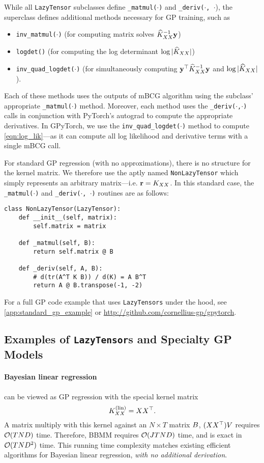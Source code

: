 While all {\tt LazyTensor} subclasses define {\tt \_matmul($\cdot$)} and {\tt \_deriv($\cdot$, $\cdot$}),
the superclass defines additional methods necessary for GP training, such as
%
\begin{itemize}
  \item {\tt inv\_matmul($\cdot$)} (for computing matrix solves $\widehat{K}_{XX}^{-1} \mathbf{y}$)
  \item {\tt logdet()} (for computing the log determinant $\log \vert \widehat{K}_{XX} \vert$)
  \item {\tt inv\_quad\_logdet($\cdot$)} (for simultaneously computing $\mathbf{y}^\top \widehat{K}_{XX}^{-1} \mathbf{y}$ and $\log \vert \widehat{K}_{XX} \vert$).
\end{itemize}
%
Each of these methods uses the outputs of mBCG algorithm using the subclass' appropriate {\tt \_matmul($\cdot$)} method.
Moreover, each method uses the {\tt \_deriv($\cdot$,$\cdot$)} calls in conjunction with PyTorch's autograd \cite{paszke2017automatic} to compute the appropriate derivatives.
In GPyTorch, we use the {\tt inv\_quad\_logdet($\cdot$)} method to compute \cref{eqn:log_lik}---as it can compute all log likelihood and derivative terms with a single mBCG call.

For standard GP regression (with no approximations), there is no structure for the kernel matrix.
We therefore use the aptly named {\tt NonLazyTensor} which simply represents an arbitrary matrix---i.e. $\mathbf{r} = K_{XX}$.
In this standard case, the {\tt \_matmul($\cdot$)} and {\tt \_deriv($\cdot$, $\cdot$)} routines are as follows:
%
\begin{verbatim}
class NonLazyTensor(LazyTensor):
    def __init__(self, matrix):
        self.matrix = matrix

    def _matmul(self, B):
        return self.matrix @ B

    def _deriv(self, A, B):
        # d(tr(A^T K B)) / d(K) = A B^T
        return A @ B.transpose(-1, -2)
\end{verbatim}
%
\noindent
For a full GP code example that uses {\tt LazyTensors} under the hood, see \cref{app:standard_gp_example} or \url{http://github.com/cornellius-gp/gpytorch}.


\subsection{Examples of {\tt LazyTensor}s and Specialty GP Models}
\paragraph{Bayesian linear regression} can be viewed as GP regression with the special kernel matrix
\[
  K_{XX}^{(\text{lin})} = XX^{\top}.
\]
A matrix multiply with this kernel against an $N \times T$ matrix $B$, $(XX^{\top})V$ requires $\bigo{TND}$ time.
Therefore, BBMM requires $\bigo{JTND}$ time, and is exact in $\bigo{TND^2}$ time.
This running time complexity matches existing efficient algorithms for Bayesian linear regression, \emph{with no additional derivation}.

